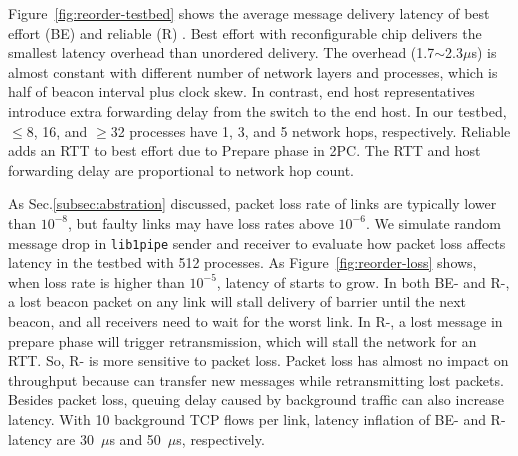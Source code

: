Figure~\ref{fig:reorder-testbed} shows the average message delivery latency of best effort (BE) and reliable (R) \sys{}.
Best effort \sys{} with reconfigurable chip delivers the smallest latency overhead than unordered delivery. The overhead (1.7$\sim$2.3$\mu$s) is almost constant with different number of network layers and processes, which is half of beacon interval plus clock skew. In contrast, end host representatives introduce extra forwarding delay from the switch to the end host. In our testbed, $\le$8, 16, and $\ge$32 processes have 1, 3, and 5 network hops, respectively.
Reliable \sys{} adds an RTT to best effort \sys{} due to Prepare phase in 2PC.
The RTT and host forwarding delay are proportional to network hop count.

As Sec.\ref{subsec:abstration} discussed, packet loss rate of links are typically lower than $10^{-8}$, but faulty links may have loss rates above $10^{-6}$.
We simulate random message drop in \texttt{lib1pipe} sender and receiver to evaluate how packet loss affects latency in the testbed with 512 processes.
As Figure~\ref{fig:reorder-loss} shows, when loss rate is higher than $10^{-5}$, latency of \sys{} starts to grow. In both BE- and R-\sys{}, a lost beacon packet on any link will stall delivery of barrier until the next beacon, and all receivers need to wait for the worst link. In R-\sys{}, a lost message in prepare phase will trigger retransmission, which will stall the network for an RTT. So, R-\sys{} is more sensitive to packet loss.
Packet loss has almost no impact on throughput because \sys{} can transfer new messages while retransmitting lost packets.
Besides packet loss, queuing delay caused by background traffic can also increase \sys{} latency. With 10 background TCP flows per link, latency inflation of BE-\sys{} and R-\sys{} latency are 30~$\mu$s and 50~$\mu$s, respectively.






